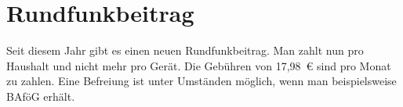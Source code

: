 \begin{urlList}
\end{urlList}



\section{Rundfunkbeitrag}
Seit diesem Jahr gibt es einen neuen Rundfunkbeitrag. Man zahlt nun pro Haushalt und nicht mehr pro Gerät. Die Gebühren von 17,98~€ sind pro Monat zu zahlen. Eine Befreiung ist unter Umständen möglich, wenn man beispielsweise BAföG erhält.

